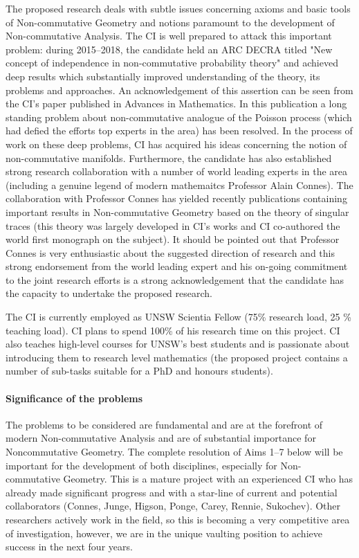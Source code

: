 \documentclass[12pt]{article}
\newcommand{\archeading}[1]{\vspace{.3cm} \noindent{\bfseries #1} \vspace{.1cm}   }
\begin{document}
\bigskip\archeading{Future Fellowship Candidate}

The proposed research deals with subtle issues concerning axioms and basic tools of Non-commutative Geometry and notions paramount to the development of Non-commutative Analysis. The CI is well prepared to attack this important problem: during 2015--2018, the candidate held an ARC DECRA titled "New concept of independence in non-commutative probability theory" and achieved deep results which substantially improved understanding of the theory, its problems and approaches. An acknowledgement of this assertion can be seen from the CI's paper \cite{JSZ_advances} published in Advances in Mathematics. In this publication a long standing problem about non-commutative analogue of the Poisson process (which had defied the efforts top experts in the area) has been resolved. In the process of work on these deep problems, CI has acquired his ideas concerning the notion of non-commutative manifolds. Furthermore, the candidate has also established strong research collaboration with a number of world leading experts in the area (including a genuine legend of modern mathemaitcs Professor Alain Connes). The collaboration with Professor Connes has yielded recently publications \cite{Connes_team} containing important results in Non-commutative Geometry based on the theory of singular traces (this theory was largely developed in CI's works and CI co-authored the world first monograph \cite{book} on the subject). It should be pointed out that Professor Connes is very enthusiastic about the suggested direction of research and this strong endorsement from the world leading expert and his on-going commitment to the joint research efforts is a strong acknowledgement that the candidate has the capacity to undertake the proposed research.

The CI is currently employed as UNSW Scientia Fellow (75\% research load, 25 \% teaching load). CI plans to spend 100\% of his research time on this project. CI also teaches high-level courses for UNSW's best students and is passionate about introducing them to research level mathematics (the proposed project contains a number of sub-tasks suitable for a PhD and honours students).

\bigskip\archeading{Project quality and innovation}


\paragraph*{{\color{green}Significance of the problems}} The problems to be considered are fundamental and are at the forefront of modern Non-commutative Analysis and are of substantial importance for Noncommutative Geometry. The complete resolution of Aims 1--7 {\color{green} below} will be important for the development of both disciplines, especially for Non-commutative Geometry. This is a mature project with an experienced CI who has already made significant progress and with a star-line of current and potential collaborators (Connes, Junge, Higson, Ponge, Carey, Rennie, Sukochev). Other researchers actively work in the field, so this is becoming a very competitive area of investigation, however, we are in the unique vaulting position to achieve success in the next four years.
\end{document}
